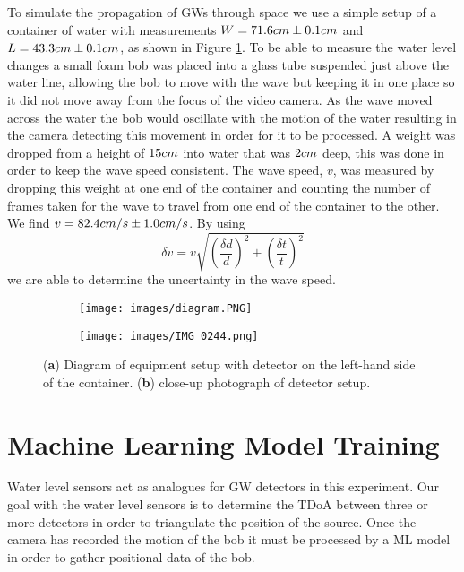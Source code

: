 To simulate the propagation of GWs through space we use a simple setup of a container of water with measurements $W = 71.6 \space cm \pm0.1\space cm$ and $L = 43.3 \space cm \space \pm \space 0.1 \space cm$, as shown in Figure \ref{fig:setup}. To be able to measure the water level changes a small foam bob was placed into a glass tube suspended just above the water line, allowing the bob to move with the wave but keeping it in one place so it did not move away from the focus of the video camera. As the wave moved across the water the bob would oscillate with the motion of the water resulting in the camera detecting this movement in order for it to be processed. A weight was dropped from a height of $15 \space cm$ into water that was $2 \space cm$ deep, this was done in order to keep the wave speed consistent. The wave speed, $v$, was measured by dropping this weight at one end of the container and counting the number of frames taken for the wave to travel from one end of the container to the other. We find $v = 82.4 \space cm/s \space \pm \space 1.0\space cm/s$. By using 
\begin{equation}
    \delta v = v \sqrt{ \left( \frac{\delta d}{d} \right)^2 + \left( \frac{\delta t}{t} \right)^2 }
\end{equation}
we are able to determine the uncertainty in the wave speed.
\begin{figure}[h!]
    \centering
    \begin{subfigure}[b]{.5\textwidth}
      \centering
      \texttt{[image: images/diagram.PNG]}
      \caption{}
      \label{fig:setup}
    \end{subfigure}%
    \begin{subfigure}[b]{.5\textwidth}
      \centering
      \texttt{[image: images/IMG\_0244.png]}
      \caption{}
      \label{fig:det-setup}
    \end{subfigure}
    \caption{(\textbf{a}) Diagram of equipment setup with detector on the left-hand side of the container. (\textbf{b}) close-up photograph of detector setup.}
    \label{fig:eqip-setup}
\end{figure}



\section{Machine Learning Model Training}
\label{sec:ML-training}

Water level sensors act as analogues for GW detectors in this experiment. Our goal with the water level sensors is to determine the TDoA between three or more detectors in order to triangulate the position of the source. Once the camera has recorded the motion of the bob it must be processed by a ML model in order to gather positional data of the bob. 

